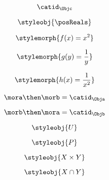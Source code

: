 {\begin{forslides}
        \begin{equation}
            \label{eq:26}
            \catid_{\Objc}
        \end{equation}
        
        \begin{equation}
            \label{eq:27}
            \styleobj{\posReals}
        \end{equation}
        
        \begin{equation}
            \label{eq:28}
            \stylemorph{f(x) = x^2}
        \end{equation}
        
        \begin{equation}
            \label{eq:29}
            \stylemorph{g(y) = \frac{1}{y}}
        \end{equation}
        
        \begin{equation}
            \label{eq:30}
            \stylemorph{h(x) = \frac{1}{x^2}}
        \end{equation}
        
        \begin{equation}
            \label{eq:31}
            \mora \then \morb = \catid_\Obja
        \end{equation}
        
        \begin{equation}
            \label{eq:32}
            \morb \then \mora = \catid_\Objb
        \end{equation}
        
        \begin{equation}
            \label{eq:33}
            \styleobj{U}
        \end{equation}
        
        \begin{equation}
            \label{eq:34}
            \styleobj{P}
        \end{equation}
        
        \begin{equation}
            \label{eq:35}
            \styleobj{X \times Y}
        \end{equation}
        
        \begin{equation}
            \label{eq:36}
            \styleobj{X \cap Y}
        \end{equation}
        

\end{forslides}}
